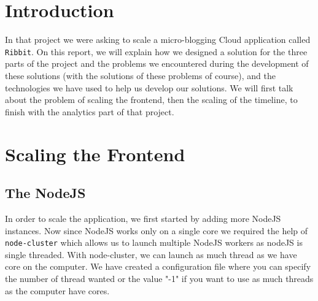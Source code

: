 \documentclass[conference,9pt]{IEEEtran}
\begin{document}



\maketitle






%
\IEEEpeerreviewmaketitle



\section{Introduction}
In that project we were asking to scale a micro-blogging Cloud application called \texttt{Ribbit}. On this report, we will explain how we designed a solution for the three parts of the project and the problems we encountered during the development of these solutions (with the solutions of these problems of course), and the technologies we have used to help us develop our solutions. We will first talk about the problem of scaling the frontend, then the scaling of the timeline, to finish with the analytics part of that project.

\section{Scaling the Frontend}
\subsection{The NodeJS}
In order to scale the application, we first started by adding more NodeJS instances. Now since NodeJS works only on a single core we required the help of \texttt{node-cluster} which allows us to launch multiple NodeJS workers as nodeJS is single threaded. With node-cluster, we can launch as much thread as we have core on the computer. We have created a configuration file where you can specify the number of thread wanted or the value "-1" if you want to use as much threads as the computer have cores.
\end{document}
